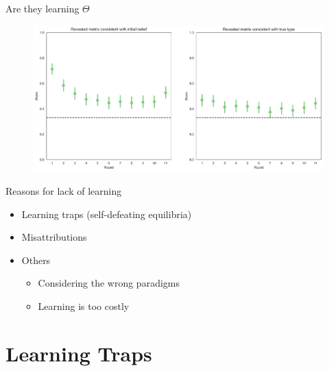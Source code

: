 \documentclass[aspectratio=169]{beamer}
\begin{document}
\begin{frame}{Are they learning $\Theta$}
    \begin{figure}
        \centering
        \includegraphics[scale=.33]{last_button_consistency.png}
    \end{figure}
    
\end{frame}

\begin{frame}{Reasons for lack of learning}
\begin{itemize}
    \item Learning traps (self-defeating equilibria)
    \bigskip 
    \item Misattributions
    \bigskip
    \item Others
    \begin{itemize}
        \item Considering the wrong paradigms
        \item Learning is too costly
    \end{itemize}
    
\end{itemize}

\end{frame}

\section*{Learning Traps}
\end{document}
